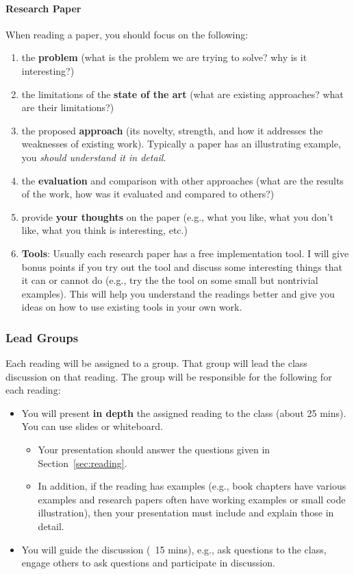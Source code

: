 \documentclass[11pt]{article}
\begin{document}
\paragraph{Research Paper} When reading a paper, you should focus on the following: 
\begin{enumerate}
    \item the \textbf{problem} (what is the problem we are trying to solve? why is it interesting?)
    \item the limitations of the \textbf{state of the art} (what are existing approaches? what are their limitations?)
    \item the proposed \textbf{approach} (its novelty, strength, and how it  addresses the weaknesses of  existing work). Typically a paper has an illustrating example, you \emph{should understand it in detail}.
    \item the \textbf{evaluation} and comparison with other approaches (what are the results of the work, how was it evaluated and compared to others?)
    \item provide \textbf{your thoughts} on the paper (e.g., what you like, what you don't like, what you think is interesting, etc.)
    \item \textbf{\textbf{Tools}}: Usually each research paper has a free implementation
tool. I will give bonus points if you try out the
tool and discuss some interesting things that it can or cannot do
(e.g., try the the tool on some small but nontrivial examples). This
will help you understand the readings better and give you ideas on
how to use existing tools in your own work.
\end{enumerate}
    
\subsubsection{Lead Groups} Each reading will be assigned to a group.  That group will lead the class discussion on that reading. The group will be responsible for the following for each reading:
\begin{itemize}
\item You will present \textbf{\textbf{in depth}} the assigned reading to the class (about 25 mins). You can use slides or whiteboard.
\begin{itemize}
    \item Your presentation should answer the questions given in Section~\ref{sec:reading}.
    \item In addition, if the reading has examples (e.g., book chapters have various examples and research papers often have working examples or small code illustration), then your presentation must include and explain those in detail.
\end{itemize}
\item You will guide the discussion (~15 mins), e.g., ask questions to the class, engage others to ask questions and participate in discussion.


\end{itemize}
\end{document}
